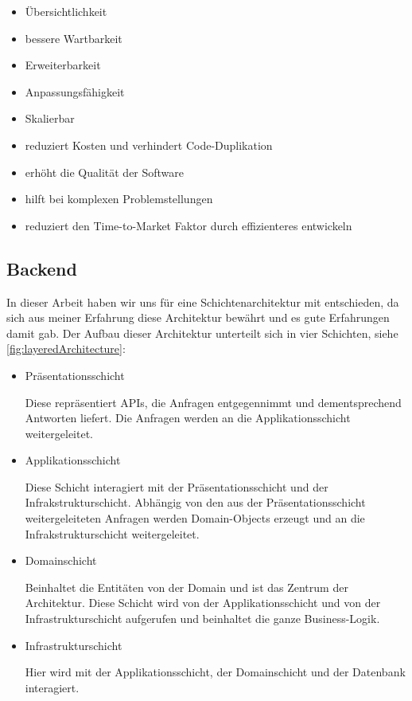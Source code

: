 \documentclass[a4paper, fontsize=11pt, parskip=half, twoside]{scrreprt}
\begin{document}
	\begin{itemize}
		\item Übersichtlichkeit
		\item bessere Wartbarkeit
		\item Erweiterbarkeit
		\item Anpassungsfähigkeit
		\item Skalierbar
		\item reduziert Kosten und verhindert Code-Duplikation
		\item erhöht die Qualität der Software
		\item hilft bei komplexen Problemstellungen
		\item reduziert den Time-to-Market Faktor durch effizienteres entwickeln
	\end{itemize}
	
	\subsection{Backend} \label{subsec:backend}
	In dieser Arbeit haben wir uns für eine Schichtenarchitektur mit  entschieden, da sich aus meiner Erfahrung diese Architektur bewährt und es gute Erfahrungen damit gab.
	Der Aufbau dieser Architektur unterteilt sich in vier Schichten, siehe \autoref{fig:layeredArchitecture}:
	
	\begin{itemize}
		\item Präsentationsschicht
		
		Diese repräsentiert \ac{API}s, die Anfragen entgegennimmt und dementsprechend Antworten liefert.
		Die Anfragen werden an die Applikationsschicht weitergeleitet.
		
		\item Applikationsschicht
		
		Diese Schicht interagiert mit der Präsentationsschicht und der Infrakstrukturschicht.
		Abhängig von den aus der Präsentationsschicht weitergeleiteten Anfragen werden Domain-Objects erzeugt und an die Infrakstrukturschicht weitergeleitet.
		
		\item Domainschicht
		
		Beinhaltet die Entitäten von der Domain und ist das Zentrum der Architektur.
		Diese Schicht wird von der Applikationsschicht und von der Infrastrukturschicht aufgerufen und beinhaltet die ganze Business-Logik.
		
		\item Infrastrukturschicht
		
		Hier wird mit der Applikationsschicht, der Domainschicht und der Datenbank interagiert.
	\end{itemize}
\end{document}
